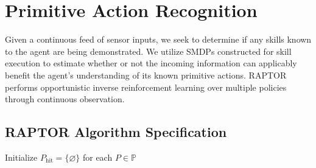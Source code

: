 \documentclass[letterpaper]{article}
\begin{document}
\section{Primitive Action Recognition}
Given a continuous feed of sensor inputs, we seek to determine if any skills known to the agent are being demonstrated. We utilize SMDPs constructed for skill execution to estimate whether or not the incoming information can applicably benefit the agent's understanding of its known primitive actions. RAPTOR performs opportunistic inverse reinforcement learning \cite{OriginalInverseRL} over multiple policies through continuous observation.

\subsection{RAPTOR Algorithm Specification}
\label{sec:recognition}

\noindent Initialize $P_{\mathrm{hit}} = \{\varnothing\}$ for each $P \in \mathbb{P}$\\
\end{document}
